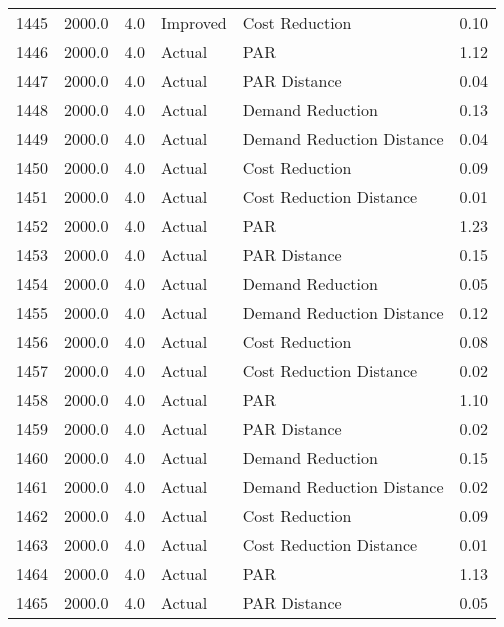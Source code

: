 \begin{longtable}{lrrllr}
1445 &       2000.0 &     4.0 &       Improved &             Cost Reduction &   0.10 \\
1446 &       2000.0 &     4.0 &         Actual &                        PAR &   1.12 \\
1447 &       2000.0 &     4.0 &         Actual &               PAR Distance &   0.04 \\
1448 &       2000.0 &     4.0 &         Actual &           Demand Reduction &   0.13 \\
1449 &       2000.0 &     4.0 &         Actual &  Demand Reduction Distance &   0.04 \\
1450 &       2000.0 &     4.0 &         Actual &             Cost Reduction &   0.09 \\
1451 &       2000.0 &     4.0 &         Actual &    Cost Reduction Distance &   0.01 \\
1452 &       2000.0 &     4.0 &         Actual &                        PAR &   1.23 \\
1453 &       2000.0 &     4.0 &         Actual &               PAR Distance &   0.15 \\
1454 &       2000.0 &     4.0 &         Actual &           Demand Reduction &   0.05 \\
1455 &       2000.0 &     4.0 &         Actual &  Demand Reduction Distance &   0.12 \\
1456 &       2000.0 &     4.0 &         Actual &             Cost Reduction &   0.08 \\
1457 &       2000.0 &     4.0 &         Actual &    Cost Reduction Distance &   0.02 \\
1458 &       2000.0 &     4.0 &         Actual &                        PAR &   1.10 \\
1459 &       2000.0 &     4.0 &         Actual &               PAR Distance &   0.02 \\
1460 &       2000.0 &     4.0 &         Actual &           Demand Reduction &   0.15 \\
1461 &       2000.0 &     4.0 &         Actual &  Demand Reduction Distance &   0.02 \\
1462 &       2000.0 &     4.0 &         Actual &             Cost Reduction &   0.09 \\
1463 &       2000.0 &     4.0 &         Actual &    Cost Reduction Distance &   0.01 \\
1464 &       2000.0 &     4.0 &         Actual &                        PAR &   1.13 \\
1465 &       2000.0 &     4.0 &         Actual &               PAR Distance &   0.05 \\

\end{longtable}
